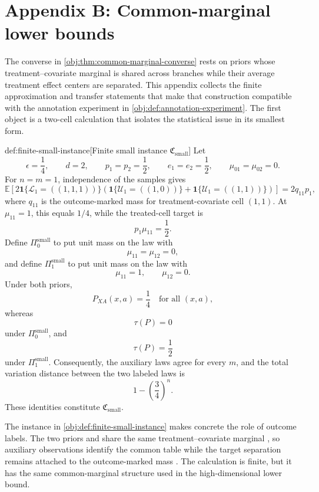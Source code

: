 \section{Appendix B: Common-marginal lower bounds}\label{sec:appendix-lower}

The converse in \cref{obj:thm:common-marginal-converse} rests on priors whose treatment--covariate marginal is shared across branches while their average treatment effect centers are separated. This appendix collects the finite approximation and transfer statements that make that construction compatible with the annotation experiment in \cref{obj:def:annotation-experiment}. The first object is a two-cell calculation that isolates the statistical issue in its smallest form.

\begin{definitionv}{def:finite-small-instance}[Finite small instance \(\mathfrak C_{\mathrm{small}}\)]
Let
\[
\epsilon=\frac14,\qquad d=2,\qquad p_1=p_2=\frac12,\qquad e_1=e_2=\frac12,\qquad \mu_{01}=\mu_{02}=0.
\]
For \(n=m=1\), independence of the samples gives
\[
\mathbb E\!\left[
2\mathbf 1\{\mathcal L_1=((1,1,1))\}
\left(\mathbf 1\{\mathcal U_1=((1,0))\}+\mathbf 1\{\mathcal U_1=((1,1))\}\right)
\right]
=2q_{11}p_1,
\]
where \(q_{11}\) is the outcome-marked mass for treatment-covariate cell \((1,1)\). At \(\mu_{11}=1\), this equals \(1/4\), while the treated-cell target is
\[
p_1\mu_{11}=\frac12.
\]
Define \(\Pi_0^{\mathrm{small}}\) to put unit mass on the law with
\[
\mu_{11}=\mu_{12}=0,
\]
and define \(\Pi_1^{\mathrm{small}}\) to put unit mass on the law with
\[
\mu_{11}=1,\qquad \mu_{12}=0.
\]
Under both priors,
\[
P_{XA}(x,a)=\frac14
\quad\text{for all }(x,a),
\]
whereas
\[
\tau(P)=0
\]
under \(\Pi_0^{\mathrm{small}}\), and
\[
\tau(P)=\frac12
\]
under \(\Pi_1^{\mathrm{small}}\). Consequently, the auxiliary laws agree for every \(m\), and the total variation distance between the two labeled laws is
\[
1-\left(\frac34\right)^n.
\]
These identities constitute \(\mathfrak C_{\mathrm{small}}\).
\end{definitionv}

The instance in \cref{obj:def:finite-small-instance} makes concrete the role of outcome labels. The two priors  and  share the same treatment--covariate marginal , so auxiliary observations identify the common table while the target separation remains attached to the outcome-marked mass . The calculation  is finite, but it has the same common-marginal structure used in the high-dimensional lower bound.

